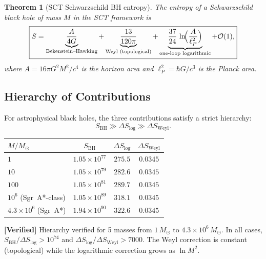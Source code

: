 \documentclass[11pt,a4paper]{article}
\theoremstyle{plain}
\newtheorem{theorem}{Theorem}[section]
\theoremstyle{definition}
\newcommand{\verified}[1]{%
  \par\smallskip\noindent
  \colorbox{green!10}{\parbox{\dimexpr\linewidth-2\fboxsep}{%
    \textcolor{green!50!black}{\textbf{[Verified]}} #1}}%
  \par\smallskip}
\begin{document}
\begin{theorem}[SCT Schwarzschild BH entropy]\label{thm:entropy}
The entropy of a Schwarzschild black hole of mass $M$ in the
SCT framework is
\begin{equation}\label{eq:full-entropy}
  \boxed{
  S = \underbrace{\frac{A}{4G}}_{\text{Bekenstein--Hawking}}
  + \underbrace{\frac{13}{120\pi}}_{\text{Weyl (topological)}}
  + \underbrace{\frac{37}{24}\,\ln\!\Bigl(\frac{A}{\ell_P^2}\Bigr)}
    _{\text{one-loop logarithmic}}
  + \mathcal{O}(1),
  }
\end{equation}
where $A = 16\pi G^2 M^2/c^4$ is the horizon area and
$\ell_P^2 = \hbar G/c^3$ is the Planck area.
\end{theorem}

\subsection{Hierarchy of Contributions}

For astrophysical black holes, the three contributions satisfy a
strict hierarchy:
\begin{equation}\label{eq:hierarchy}
  S_{\mathrm{BH}} \gg \Delta S_{\log} \gg \Delta S_{\mathrm{Weyl}}.
\end{equation}

\begin{center}
\begin{tabular}{lccc}
\toprule
$M/M_\odot$ & $S_{\mathrm{BH}}$ & $\Delta S_{\log}$ &
$\Delta S_{\mathrm{Weyl}}$ \\
\midrule
$1$ & $1.05 \times 10^{77}$ & $275.5$ & $0.0345$ \\
$10$ & $1.05 \times 10^{79}$ & $282.6$ & $0.0345$ \\
$100$ & $1.05 \times 10^{81}$ & $289.7$ & $0.0345$ \\
$10^6$ (Sgr~A*-class) & $1.05 \times 10^{89}$ & $318.1$ & $0.0345$ \\
$4.3 \times 10^6$ (Sgr~A*) & $1.94 \times 10^{90}$ & $322.6$ & $0.0345$ \\
\bottomrule
\end{tabular}
\end{center}

\verified{Hierarchy verified for 5 masses from $1\,M_\odot$ to
$4.3 \times 10^6\,M_\odot$. In all cases,
$S_{\mathrm{BH}}/\Delta S_{\log} > 10^{74}$ and
$\Delta S_{\log}/\Delta S_{\mathrm{Weyl}} > 7000$.
The Weyl correction is constant (topological) while the
logarithmic correction grows as $\ln M^2$.}
\end{document}
